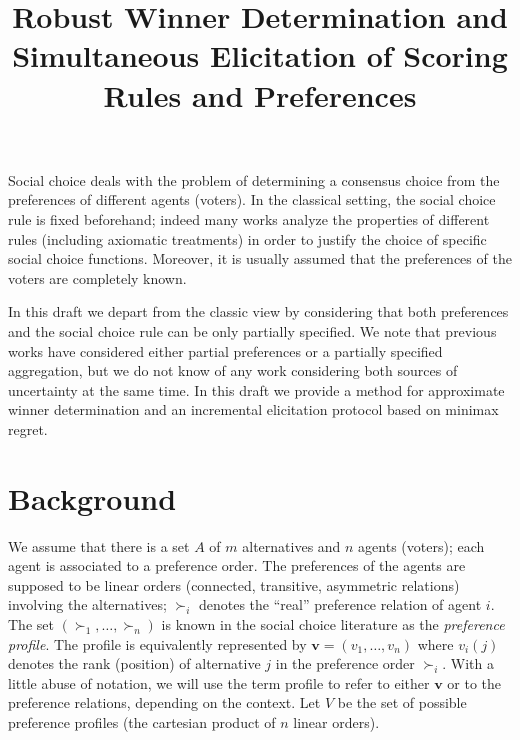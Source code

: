\documentclass[12pt]{article}
\title{Robust Winner Determination and Simultaneous Elicitation of Scoring Rules and Preferences}
\newcommand{\pref}{\succ}%
\newcommand{\profile}{\textbf{v}}%
\begin{document}
\maketitle

Social choice deals with the problem of determining a consensus choice from the preferences of different agents (voters).
In the classical setting, the social choice rule is fixed beforehand; indeed many works analyze the properties of different rules (including axiomatic treatments) in order to justify the choice of specific social choice functions. 
Moreover, it is usually assumed that the preferences of the voters are completely known. 

In this draft we depart from the classic view by considering that both preferences and the social choice rule can be only partially specified.
We note that previous works have considered either partial preferences or a partially specified aggregation, but we do not know of any work considering both sources of uncertainty at the same time.
In this draft we provide a method for approximate winner determination and an incremental elicitation protocol based on minimax regret. 


\section{Background}

We assume that there is a set $A$ of $m$ alternatives and $n$ agents (voters); each agent is associated to a preference order.
The preferences of the agents are supposed to be linear orders (connected, transitive, asymmetric relations) involving the alternatives;
$\pref_i$ denotes the ``real'' preference relation of agent $i$. 
The set $(\pref_1,\ldots,\pref_n)$ is known in the social choice literature as the {\em preference  profile}.
The profile is equivalently represented by $\profile=(v_1,\ldots,v_n)$ where $v_i(j)$ denotes the rank (position) of alternative $j$ in the preference order $\pref_i$. 
With a little abuse of notation, we will use the term profile to refer to either $\profile$ or to the preference relations, depending on the context.
Let $V$ be the set of possible preference profiles (the cartesian product of $n$ linear orders).
\end{document}
